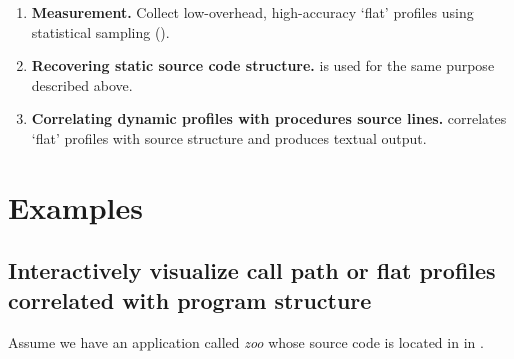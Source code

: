 \documentclass[english]{article}
\begin{document}
\begin{enumerate}
\item \textbf{Measurement.}  
Collect low-overhead, high-accuracy `flat' profiles using statistical sampling ().

\item \textbf{Recovering static source code structure.} 
 is used for the same purpose described above.

\item \textbf{Correlating dynamic profiles with procedures source lines.} 
 correlates `flat' profiles with source structure and produces textual output.

\end{enumerate}

\section{Examples}

\subsection{Interactively visualize call path or flat profiles correlated with program structure}

Assume we have an application called \emph{zoo} whose source code is located in in .
\end{document}
